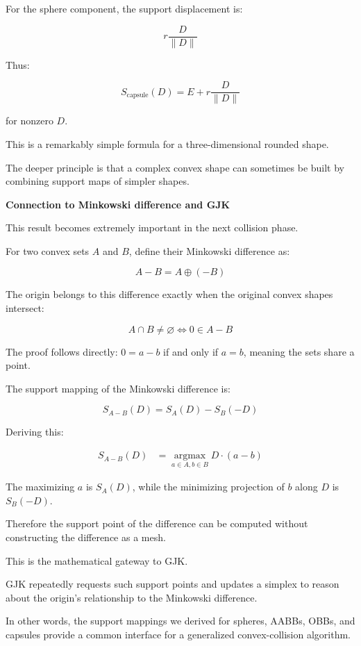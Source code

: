 For the sphere component, the support displacement is:

\[
r\frac{D}{\|D\|}
\]

Thus:

\[
\boxed{ S_{\mathrm{capsule}}(D) = E+r\frac{D}{\|D\|} }
\]

for nonzero \(D\).

This is a remarkably simple formula for a three-dimensional rounded shape.

The deeper principle is that a complex convex shape can sometimes be built by combining support maps of simpler shapes.

\textbf{Connection to Minkowski difference and GJK}

This result becomes extremely important in the next collision phase.

For two convex sets \(A\) and \(B\), define their Minkowski difference as:

\[
A-B=A\oplus(-B)
\]

The origin belongs to this difference exactly when the original convex shapes intersect:

\[
\boxed{ A\cap B\ne\varnothing \iff 0\in A-B }
\]

The proof follows directly: \(0=a-b\) if and only if \(a=b\), meaning the sets share a point.

The support mapping of the Minkowski difference is:

\[
\boxed{ S_{A-B}(D)=S_A(D)-S_B(-D) }
\]

Deriving this:

\[
\begin{aligned} S_{A-B}(D) &=\underset{a\in A,b\in B}{\operatorname{argmax}} D\cdot(a-b) \end{aligned}
\]

The maximizing \(a\) is \(S_A(D)\), while the minimizing projection of \(b\) along \(D\) is \(S_B(-D)\).

Therefore the support point of the difference can be computed without constructing the difference as a mesh.

This is the mathematical gateway to GJK.

GJK repeatedly requests such support points and updates a simplex to reason about the origin's relationship to the Minkowski difference.

In other words, the support mappings we derived for spheres, AABBs, OBBs, and capsules provide a common interface for a generalized convex-collision algorithm.

